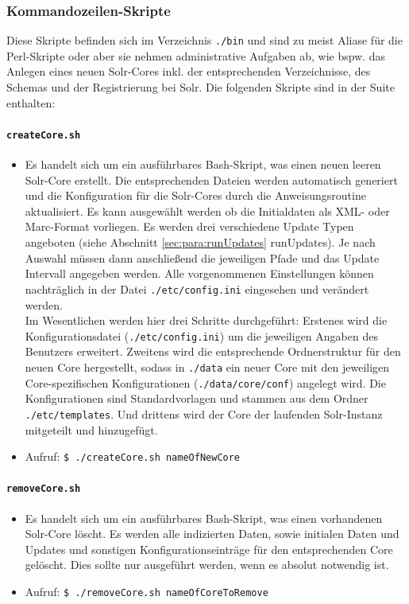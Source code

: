 \documentclass[10pt]{article}
\begin{document}
\subsubsection{Kommandozeilen-Skripte}
\label{sec:subsub:Kommando}
Diese Skripte befinden sich im Verzeichnis \texttt{./bin} und sind zu meist Aliase für die Perl-Skripte oder aber sie nehmen administrative Aufgaben ab, wie bspw. das Anlegen eines neuen Solr-Cores inkl. der entsprechenden Verzeichnisse, des Schemas und der Registrierung bei Solr. Die folgenden Skripte sind in der Suite enthalten:

\paragraph{\texttt{createCore.sh}}
\label{sec:para:createCore}
\begin{itemize}
	\item Es handelt sich um ein ausführbares Bash-Skript, was einen neuen leeren Solr-Core erstellt. Die entsprechenden Dateien werden automatisch generiert und die Konfiguration für die Solr-Cores durch die Anweisungsroutine aktualisiert. Es kann ausgewählt werden ob die Initialdaten als XML- oder Marc-Format vorliegen. Es werden drei verschiedene Update Typen angeboten (siehe Abschnitt \ref{sec:para:runUpdates} runUpdates). Je nach Auswahl müssen dann anschließend die jeweiligen Pfade und das Update Intervall angegeben werden. Alle vorgenommenen Einstellungen können nachträglich in der Datei \texttt{./etc/config.ini} eingesehen und verändert werden. \\
	Im Wesentlichen werden hier drei Schritte durchgeführt: Erstenes wird die Konfigurationsdatei (\texttt{./etc/config.ini}) um die jeweiligen Angaben des Benutzers erweitert. Zweitens wird die entsprechende Ordnerstruktur für den neuen Core hergestellt, sodass in \texttt{./data} ein neuer Core mit den jeweiligen Core-spezifischen Konfigurationen (\texttt{./data/core/conf}) angelegt wird. Die Konfigurationen sind Standardvorlagen und stammen aus dem Ordner \texttt{./etc/templates}. Und drittens wird der Core der laufenden Solr-Instanz mitgeteilt und hinzugefügt.
	\item Aufruf: \texttt{\$ ./createCore.sh nameOfNewCore}
\end{itemize}

\paragraph{\texttt{removeCore.sh}}
\label{sec:para:removeCore}
\begin{itemize}
	\item Es handelt sich um ein ausführbares Bash-Skript, was einen vorhandenen Solr-Core löscht. Es werden alle indizierten Daten, sowie initialen Daten und Updates und sonstigen Konfigurationseinträge für den entsprechenden Core gelöscht. Dies sollte nur ausgeführt werden, wenn es absolut notwendig ist.
	\item Aufruf: \texttt{\$ ./removeCore.sh nameOfCoreToRemove}
\end{itemize}
\end{document}
